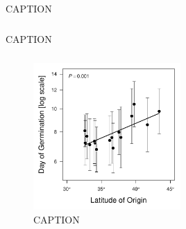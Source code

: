 \documentclass[11pt, oneside]{article}\usepackage[]{graphicx}\usepackage[]{color}
\begin{document}
\begin{table}[htbp]
	\fontsize{10}{12}
	\selectfont
	\caption[ANOVA table, leaf expansion rate]{CAPTION}
	\begin{center}
	\begin{tabular}{lcccccc}
	\toprule

	

	\bottomrule
	\end{tabular}
	\end{center}
\end{table}

\begin{table}[htbp]
	\fontsize{10}{12}
	\selectfont
	\caption[ANOVA table, shoot elongation rate]{CAPTION}
	\begin{center}
	\begin{tabular}{lcccccc}
	\toprule

	

	\bottomrule
	\end{tabular}
	\end{center}
\end{table}


\begin{figure}[h!]
	\centerline{\includegraphics[width=0.5\textwidth]{Figures/Figure_DoG_Lat.pdf}}
	\fontsize{10}{12}
	\selectfont
	\caption[Southern populations germinate sooner.]{CAPTION}
	\label{fig:Fig_DoG}
\end{figure}
\end{document}
